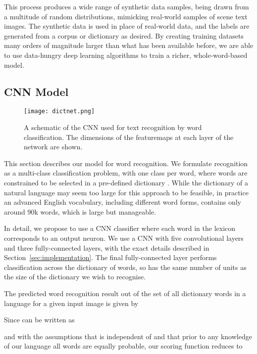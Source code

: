 \documentclass[twocolumn]{svjour3}          \smartqed  \usepackage{epsfig}
\begin{document}
This process produces a wide range of synthetic data samples, being drawn from a multitude of random distributions, mimicking real-world samples of scene text images. The synthetic data is used in place of real-world data, and the labels are generated from a corpus or dictionary as desired. By creating training datasets many orders of magnitude larger than what has been available before, we are able to use data-hungry deep learning algorithms to train a richer, whole-word-based model.


\subsection{CNN Model}
\label{sec:model}

\begin{figure*}[t]
\centering
\texttt{[image: dictnet.png]}
\caption{A schematic of the CNN used for text recognition by word classification. The dimensions of the featuremaps at each layer of the network are shown.}
\label{fig:dictnet}
\end{figure*}

\newcommand{\dict}{\mathcal{W}}
This section describes our model for word recognition. We formulate recognition as a multi-class classification problem, with one class per word, where words  are constrained to be selected in a pre-defined dictionary . While the dictionary  of a natural language may seem too large for this approach to be feasible, in practice an advanced English vocabulary, including different word forms, contains only around 90k words, which is large but manageable.

In detail, we propose to use a CNN classifier where each word  in the lexicon corresponds to an output neuron. We use a CNN with five convolutional layers and three fully-connected layers, with the exact details described in Section~\ref{sec:implementation}. The final fully-connected layer performs classification across the dictionary of words, so has the same number of units as the size of the dictionary we wish to recognise. 

The predicted word recognition result  out of the set of all dictionary words  in a language  for a given input image  is given by 

Since  can be written as

and with the assumptions that  is independent of  and that prior to any knowledge of our language all words are equally probable, our scoring function reduces to 
\end{document}
